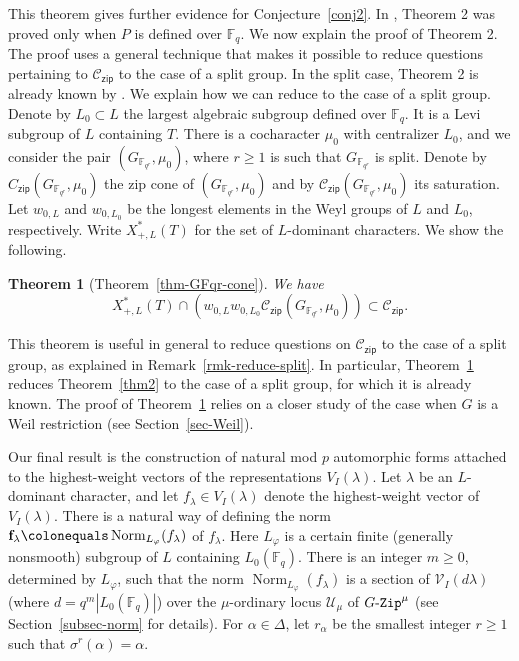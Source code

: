 \documentclass[11pt]{amsart}
\numberwithin{equation}{section}
\newtheorem{thmIntro}{Theorem}
\theoremstyle{definition}
\theoremstyle{remark}
\newcommand{\GZip}{\mathop{\text{$G$-{\tt Zip}}}\nolimits}
\newcommand{\zipsf}{\mathsf{zip}}
\newcommand{\Ccal}{{\mathcal C}}
\newcommand{\Ucal}{{\mathcal U}}
\newcommand{\Vcal}{{\mathcal V}}
\newcommand{\FF}{\mathbb{F}}
\DeclareMathOperator{\Norm}{Norm}
\begin{document}
This theorem gives further evidence for Conjecture~\ref{conj2}. In \cite[Corollary 3.5.6]{Koskivirta-automforms-GZip}, Theorem 2 was proved only when $P$ is defined over $\FF_q$. We now explain the proof of Theorem 2. The proof uses a general technique that makes it possible to reduce questions pertaining to $\Ccal_{\zipsf}$ to the case of a split group. In the split case, Theorem 2 is already known by \cite[Corollary 3.5.6]{Koskivirta-automforms-GZip}. We explain how we can reduce to the case of a split group. Denote by $L_0\subset L$ the largest algebraic subgroup defined over $\FF_q$. It is a Levi subgroup of $L$ containing $T$. There is a cocharacter $\mu_0$ with centralizer $L_0$, and we consider the pair $(G_{\FF_{q^r}},\mu_0)$, where $r\geq 1$ is such that $G_{\FF_{q^r}}$ is split. Denote by $C_{\zipsf}(G_{\FF_{q^r}},\mu_0)$ the zip cone of $(G_{\FF_{q^r}},\mu_0)$ and by $\Ccal_{\zipsf}(G_{\FF_{q^r}},\mu_0)$ its saturation. Let $w_{0,L}$ and $w_{0,L_0}$ be the longest elements in the Weyl groups of $L$ and $L_0$, respectively. Write $X_{+,L}^*(T)$ for the set of $L$-dominant characters. We show the following.

\begin{thmIntro}[Theorem~\ref{thm-GFqr-cone}]\label{thm-GFqr-cone-intro}
We have
\begin{equation}
  X_{+,L}^*(T) \cap \left(w_{0,L} w_{0,L_0} \Ccal_{\zipsf}\left(G_{\FF_{q^r}},\mu_0\right) \right) \subset \Ccal_{\zipsf}.
\end{equation}
\end{thmIntro}

This theorem is useful in general to reduce questions on $\Ccal_{\zipsf}$ to the case of a split group, as explained in Remark~\ref{rmk-reduce-split}. In particular, Theorem~\ref{thm-GFqr-cone-intro} reduces Theorem~\ref{thm2} to the case of a split group, for which it is already known. The proof of Theorem~\ref{thm-GFqr-cone-intro} relies on a closer study of the case when $G$ is a Weil restriction (see Section~\ref{sec-Weil}).


Our final result is the construction of natural mod $p$ automorphic forms attached to the highest-weight vectors of the representations $V_I(\lambda)$. Let $\lambda$ be an $L$-dominant character, and let $f_\lambda\in V_I(\lambda)$ denote the highest-weight vector of $V_I(\lambda)$. There is a natural way of defining the norm $\mathbf{f}_\lambda \colonequals \Norm_{L_\varphi}(f_\lambda)$ of $f_{\lambda}$. Here $L_\varphi$ is a certain finite (generally nonsmooth) subgroup of $L$ containing $L_0(\FF_q)$. There is an integer $m\geq 0$, determined by $L_\varphi$, such that the norm $\Norm_{L_\varphi}(f_\lambda)$ is a section of $\Vcal_I(d\lambda)$ (where $d=q^m|L_0(\FF_q)|$) over the $\mu$-ordinary locus $\Ucal_\mu$ of $\GZip^\mu$ (see Section~\ref{subsec-norm} for details). For $\alpha\in \Delta$, let $r_\alpha$ be the smallest integer $r\geq 1$ such that $\sigma^r(\alpha)=\alpha$.
\end{document}
